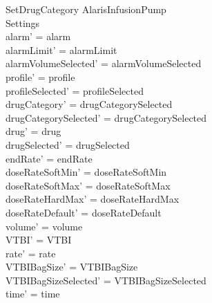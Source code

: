 \begin{schema}{SetDrugCategory}
\pagebreak
	\Delta AlarisInfusionPump\\
	 Settings\\
	\where
	alarm' = alarm\\
	alarmLimit' = alarmLimit\\
	alarmVolumeSelected' = alarmVolumeSelected\\
	profile' = profile\\
	profileSelected' = profileSelected\\
	drugCategory' = drugCategorySelected\\ 
	drugCategorySelected' = drugCategorySelected\\
	drug' = drug\\ 
	drugSelected' = drugSelected\\
	endRate' = endRate\\
	doseRateSoftMin' = doseRateSoftMin\\
	doseRateSoftMax' = doseRateSoftMax\\
	doseRateHardMax' = doseRateHardMax\\
	doseRateDefault' = doseRateDefault\\
	volume' = volume\\
	VTBI' = VTBI\\
	rate' = rate\\
	VTBIBagSize' = VTBIBagSize\\ 
	VTBIBagSizeSelected' = VTBIBagSizeSelected\\
	time' = time\\

\end{schema}
